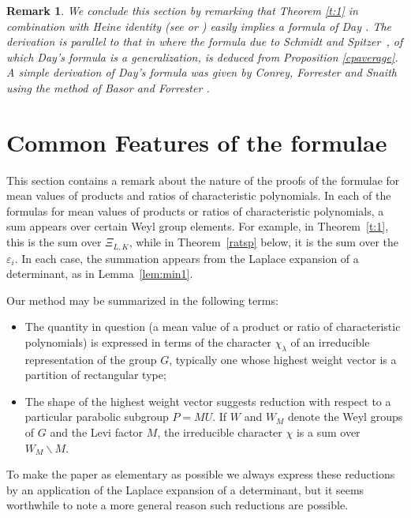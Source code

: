 \documentclass[11pt]{amsart}
\newtheorem{varremark}{Remark}
\newenvironment{remark}{\begin{varremark}\em}{\em\end{varremark}}
\begin{document}
\begin{remark} We conclude this section by remarking that Theorem
\ref{t:1} in combination with Heine identity (see \cite{GS39} or
\cite{BD02}) easily implies a formula of Day \cite{day}. The
derivation is parallel to that in \cite[Section 3]{DG04} where the
formula due to Schmidt and Spitzer~\cite{SS60}, of which Day's
formula is a generalization, is deduced from Proposition
\ref{cpaverage}. A simple derivation of Day's formula was given by
Conrey, Forrester and Snaith \cite{cfs} using the method of Basor
and Forrester {\cite{bf94}}.
\end{remark}

\section{Common Features of the formulae} \label{comf}

This section contains a remark about the nature of the proofs of
the formulae for mean values of products and ratios of
characteristic polynomials. In each of the formulas for mean
values of products or ratios of characteristic polynomials, a sum
appears over certain Weyl group elements. For example, in
Theorem~\ref{t:1}, this is the sum over $\Xi_{L, K}$, while in
Theorem~\ref{ratsp} below, it is the sum over the $\varepsilon_i$.
In each case, the summation appears from the Laplace expansion of
a determinant, as in Lemma~\ref{lem:min1}.

Our method may be summarized in the following terms:
\begin{itemize}
  \item The quantity in question (a mean value of a product or ratio of
  characteristic polynomials) is expressed in terms of the character
  $\chi_{\lambda}$ of an irreducible representation of the group $G$,
  typically one whose highest weight vector is a partition of rectangular
  type;

  \item The shape of the highest weight vector suggests reduction with respect
  to a particular parabolic subgroup $P = M U$. If $W$ and $W_M$ denote the
  Weyl groups of $G$ and the Levi factor $M$, the irreducible character $\chi$
  is a sum over $W_M \backslash M$.
\end{itemize}
To make the paper as elementary as possible we always express
these reductions by an application of the Laplace expansion of a
determinant, but it seems worthwhile to note a more general reason
such reductions are possible.
\end{document}
